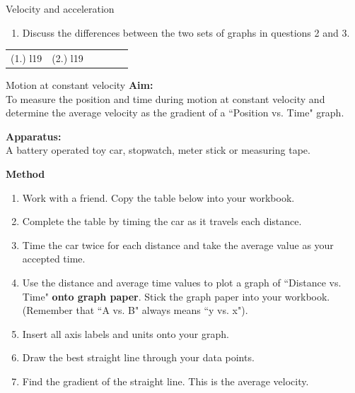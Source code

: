 \begin{exercises}{Velocity and acceleration }
\begin{enumerate}[noitemsep, label=\textbf{\arabic*}. ]
\begin{enumerate}[noitemsep, label=\textbf{\alph*}. ]
\label{m38795*uid100}\item Discuss the differences between the two sets of graphs in questions 2 and 3.\end{enumerate}
        \end{enumerate}
\label{m38795*secfhsst!!!underscore!!!id2603}
\par \practiceinfo
 \par \begin{tabular}[h]{cccccc}
 (1.) l19  &  (2.) l19  & \end{tabular}
\end{exercises}
\begin{g_experiment}{Motion at constant velocity }
            \nopagebreak
\textbf{Aim:}\\
To measure the position and time during motion at constant velocity and determine the average velocity as the gradient of a ``Position vs. Time" graph.\par 
        \label{m38795*id71286}\noindent{}\textbf{Apparatus:}\\
 A battery operated toy car, stopwatch, meter stick or measuring tape.\par 
        \label{m38795*id71301}\noindent{}\textbf{Method}\\
        \label{m38795*id71310}\begin{enumerate}[noitemsep, label=\textbf{\arabic*}. ] 
            \label{m38795*uid101}\item Work with a friend. Copy the table below into your workbook.
\label{m38795*uid102}\item Complete the table by timing the car as it travels each distance.
\label{m38795*uid103}\item Time the car twice for each distance and take the average value as your accepted time.
\label{m38795*uid104}\item Use the distance and average time values to plot a graph of ``Distance vs. Time" \textbf{onto graph paper}. Stick the graph paper into your workbook. (Remember that ``A vs. B" always means ``y vs. x").
\label{m38795*uid105}\item Insert all axis labels and units onto your graph.
\label{m38795*uid106}\item Draw the best straight line through your data points.
\label{m38795*uid107}\item Find the gradient of the straight line. This is the average velocity.
\end{enumerate}
        \par 

\end{g_experiment}
